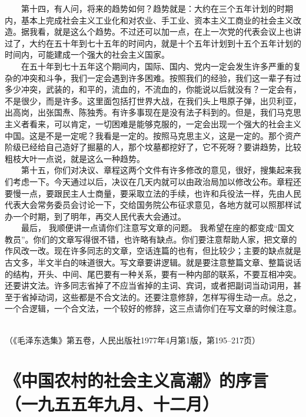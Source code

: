 \documentclass[cn,11pt,chinese]{elegantbook}
\def\myformat#1{\hfil\hfil #1}
\begin{document}
　　第十四，有人问，将来的趋势如何？趋势就是：大约在三个五年计划的时期内，基本上完成社会主义工业化和对农业、手工业、资本主义工商业的社会主义改造。据我看，就是这么个趋势。不过还可以加一点，在上一次党的代表会议上也讲过了，大约在五十年到七十五年的时间内，就是十个五年计划到十五个五年计划的时间内，可能建成一个强大的社会主义国家。\\
　　在五十年到七十五年这个期间内，国际、国内、党内一定会发生许多严重的复杂的冲突和斗争，我们一定会遇到许多困难。按照我们的经验，我们这一辈子有过多少冲突，武装的，和平的，流血的，不流血的，你能说以后就没有？一定会有，不是很少，而是许多。这里面包括打世界大战，在我们头上甩原子弹，出贝利亚，出高岗，出张国焘、陈独秀。有许多事现在是没有法子料到的。但是，我们马克思主义者看来，可以肯定，一切困难是能够克服的，一定会出现一个强大的社会主义中国。这是不是一定呢？我看是一定的。按照马克思主义，这是一定的。那个资产阶级已经给自己造好了掘墓的人，那个坟墓都挖好了，它不死呀？要讲趋势，比较粗枝大叶一点说，就是这么一种趋势。\\
　　第十五，你们对决议、章程这两个文件有许多修改的意见，很好，搜集起来我们考虑一下。今天通过以后，决议在几天内就可以由政治局加以修改公布。章程还要慢一点，要跟民主人士商量，要采取立法的手续，也许和兵役法一样，先由人民代表大会常务委员会讨论一下，交给国务院公布征求意见，各地方就可以照那样试办一个时期，到了明年，再交人民代表大会通过。\\
　　最后， 我顺便讲一点请你们注意写文章的问题。 我希望在座的都变成“国文教员”。你们的文章写得很不错，也许略有缺点。你们要注意帮助人家，把文章的作风改一改。现在许多同志的文章，空话连篇的也有，但比较少；主要的缺点就是古文多，半文半白的味道很大。写文章要讲逻辑。就是要注意整篇文章、整篇说话的结构，开头、中间、尾巴要有一种关系，要有一种内部的联系，不要互相冲突。还要讲文法。许多同志省掉了不应当省掉的主词、宾词，或者把副词当动词用，甚至于省掉动词，这些都是不合文法的。还要注意修辞，怎样写得生动一点。总之，一个合逻辑，一个合文法，一个较好的修辞，这三点请你们在写文章的时候注意。\\
　　
\begin{flushright}
（《毛泽东选集》第五卷，人民出版社1977年4月第1版，第195--217页）
\end{flushright}



\section*{\myformat{《中国农村的社会主义高潮》的序言}\\\myformat{（一九五五年九月、十二月）}}
\end{document}
